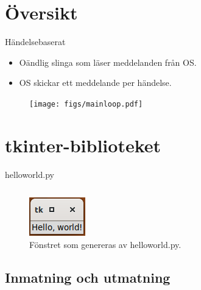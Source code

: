 \mode*

\section{Översikt}

\begin{frame}[fragile]
  \begin{block}{Händelsebaserat}
    \begin{itemize}
      \item Oändlig slinga som läser meddelanden från OS.
      \item OS skickar ett meddelande per händelse.
    \end{itemize}
  \end{block}

  \begin{figure}
    \texttt{[image: figs/mainloop.pdf]}
  \end{figure}
\end{frame}


\section{tkinter-biblioteket}

\begin{frame}[fragile]
  helloworld.py \hrulefill
  \inputminted[linenos]{python}{examples/helloworld.py}
\end{frame}

\begin{frame}
  \centering
  \begin{figure}
    \includegraphics{figs/helloworld.png}
    \caption{Fönstret som genereras av helloworld.py.}
  \end{figure}
\end{frame}

\subsection{Inmatning och utmatning}

